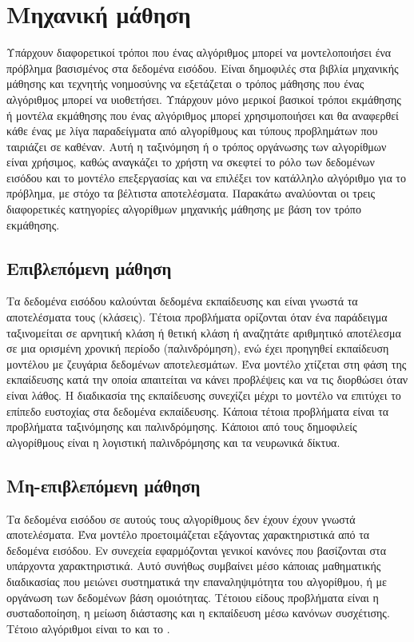 \section{Μηχανική μάθηση}
Υπάρχουν διαφορετικοί τρόποι που ένας αλγόριθμος μπορεί να μοντελοποιήσει ένα πρόβλημα βασισμένος στα δεδομένα εισόδου. Είναι δημοφιλές στα βιβλία μηχανικής μάθησης και τεχνητής νοημοσύνης να εξετάζεται ο τρόπος μάθησης που ένας αλγόριθμος μπορεί να υιοθετήσει. Υπάρχουν μόνο μερικοί βασικοί τρόποι εκμάθησης ή μοντέλα εκμάθησης που ένας αλγόριθμος μπορεί χρησιμοποιήσει και θα αναφερθεί κάθε ένας με λίγα παραδείγματα από αλγορίθμους και τύπους προβλημάτων που ταιριάζει σε καθέναν. Αυτή η ταξινόμηση ή ο τρόπος οργάνωσης των αλγορίθμων είναι χρήσιμος, καθώς αναγκάζει το χρήστη να σκεφτεί το ρόλο των δεδομένων εισόδου και το μοντέλο επεξεργασίας και να επιλέξει τον κατάλληλο αλγόριθμο για το πρόβλημα, με στόχο τα βέλτιστα αποτελέσματα. Παρακάτω αναλύονται οι τρεις διαφορετικές κατηγορίες αλγορίθμων μηχανικής μάθησης με βάση τον τρόπο εκμάθησης.
\subsection{Επιβλεπόμενη μάθηση}
Τα δεδομένα εισόδου καλούνται δεδομένα εκπαίδευσης και είναι γνωστά τα αποτελέσματα τους (κλάσεις). Τέτοια προβλήματα ορίζονται όταν ένα παράδειγμα ταξινομείται σε αρνητική κλάση ή θετική κλάση ή αναζητάτε αριθμητικό αποτέλεσμα σε μια ορισμένη χρονική περίοδο (παλινδρόμηση), ενώ έχει προηγηθεί εκπαίδευση μοντέλου με ζευγάρια δεδομένων αποτελεσμάτων. Ένα μοντέλο χτίζεται στη φάση της εκπαίδευσης κατά την οποία απαιτείται να κάνει προβλέψεις και να τις διορθώσει όταν είναι λάθος. Η διαδικασία της εκπαίδευσης συνεχίζει μέχρι το μοντέλο να επιτύχει το επίπεδο ευστοχίας στα δεδομένα εκπαίδευσης. Κάποια τέτοια προβλήματα είναι τα προβλήματα ταξινόμησης και παλινδρόμησης. Κάποιοι από τους δημοφιλείς αλγορίθμους είναι η λογιστική παλινδρόμησης και τα νευρωνικά δίκτυα.
\subsection{Μη-επιβλεπόμενη μάθηση}
Τα δεδομένα εισόδου σε αυτούς τους αλγορίθμους δεν έχουν έχουν γνωστά αποτελέσματα. Ένα μοντέλο προετοιμάζεται εξάγοντας χαρακτηριστικά από τα δεδομένα εισόδου. Εν συνεχεία εφαρμόζονται γενικοί κανόνες που βασίζονται στα υπάρχοντα χαρακτηριστικά. Αυτό συνήθως συμβαίνει μέσο κάποιας μαθηματικής διαδικασίας που μειώνει συστηματικά την επαναληψιμότητα του αλγορίθμου, ή με οργάνωση των δεδομένων βάση ομοιότητας. Τέτοιου είδους προβλήματα είναι η συσταδοποίηση, η μείωση διάστασης και η εκπαίδευση μέσω κανόνων συσχέτισης. Τέτοιο αλγόριθμοι είναι το  και το .
